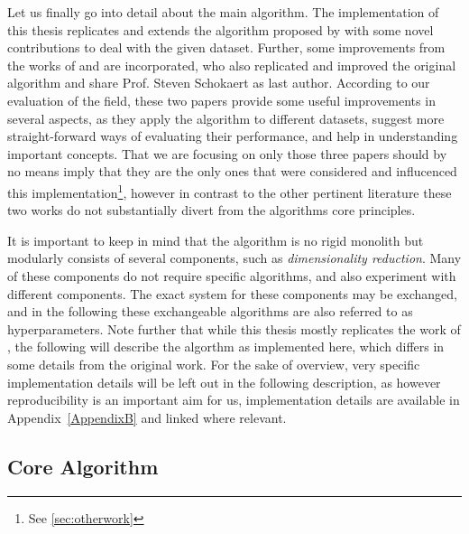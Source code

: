 Let us finally go into detail about the main algorithm. The implementation of this thesis replicates and extends the algorithm proposed by \textcite{Derrac2015} with some novel contributions to deal with the given dataset. Further, some improvements from the works of \textcite{Ager2018} and \textcite{Alshaikh2020} are incorporated, who also replicated and improved the original algorithm and share Prof. Steven Schokaert as last author. According to our evaluation of the field, these two papers provide some useful improvements in several aspects, as they apply the algorithm to different datasets, suggest more straight-forward ways of evaluating their performance, and help in understanding important concepts. That we are focusing on only those three papers should by no means imply that they are the only ones that were considered and influcenced this implementation\footnote{See \autoref{sec:otherwork}}, however in contrast to the other pertinent literature these two works do not substantially divert from the algorithms core principles.

It is important to keep in mind that the algorithm is no rigid monolith but modularly consists of several components, such as \textit{dimensionality reduction}. Many of these components do not require specific algorithms, and \mainalgos also experiment with different components. The exact system for these components may be exchanged, and in the following these exchangeable algorithms are also referred to as hyperparameters. Note further that while this thesis mostly replicates the work of \textcite{Derrac2015}, the following will describe the algorthm as implemented here, which differs in some details from the original work. For the sake of overview, very specific implementation details will be left out in the following description, as however reproducibility is an important aim for us, implementation details are available in Appendix~\ref{AppendixB} and linked where relevant. 

\subsection*{Core Algorithm}

